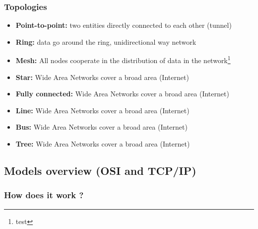   \begin{frame}
    \frametitle{Topologies}
    \begin{itemize}
      \item \textbf{Point-to-point:} two entities directly connected to each other (tunnel) \pause
      \item \textbf{Ring:} data go around the ring, unidirectional way network \pause
      \item \textbf{Mesh:} All nodes cooperate in the distribution of data in the network\footnote{test} \pause
      \item \textbf{Star:} Wide Area Networks cover a broad area (Internet)\pause
      \item \textbf{Fully connected:} Wide Area Networks cover a broad area (Internet)\pause
      \item \textbf{Line:} Wide Area Networks cover a broad area (Internet)\pause
      \item \textbf{Bus:} Wide Area Networks cover a broad area (Internet)\pause
      \item \textbf{Tree:} Wide Area Networks cover a broad area (Internet)
    \end{itemize}
  \end{frame}


\subsection{Models overview (OSI and TCP/IP)}
  \begin{frame}
    \frametitle{How does it work ?}
  \end{frame}